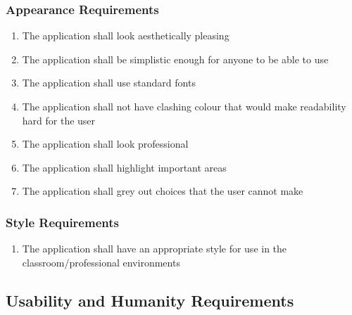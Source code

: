 \documentclass[]{article}
\begin{document}
\subsubsection{Appearance Requirements}
\label{ssub:appearance_requirements}
\begin{enumerate}[{LF}1. ]
	\item The application shall look aesthetically pleasing
	\item The application shall be simplistic enough for anyone to be able to use
	\item The application shall use standard fonts
	\item The application shall not have clashing colour that would make
readability hard for the user
	\item The application shall look professional
	\item The application shall highlight important areas
	\item The application shall grey out choices that the user cannot make

\end{enumerate}

\subsubsection{Style Requirements}
\label{ssub:style_requirements}
\begin{enumerate}[{LF}1. ]
	\item The application shall have an appropriate style for use in the
classroom/professional environments
\end{enumerate}


\subsection{Usability and Humanity Requirements}
\label{sub:usability_and_humanity_requirements}
\end{document}
